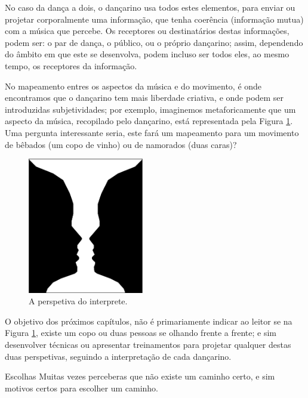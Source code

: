 No caso da dança a dois, o dançarino usa todos estes elementos, 
para enviar ou projetar corporalmente uma informação, que tenha coerência (informação mutua) com a música que percebe.
Os receptores ou destinatários destas informações, podem ser: o par de dança,
o público, ou o próprio dançarino; 
assim, dependendo do âmbito em que este se desenvolva,
podem incluso ser todos eles, ao mesmo tempo, os receptores da informação.

No mapeamento entres os aspectos da música e do movimento, 
é onde encontramos que o dançarino tem mais liberdade criativa, 
e onde podem ser introduzidas subjetividades; por exemplo,
imaginemos metaforicamente que um aspecto da música, recopilado pelo dançarino, 
está representada pela Figura \ref{fig:LaCopaDeRubin}.
Uma pergunta interessante seria, 
este fará um mapeamento para um  movimento de bêbados (um copo de vinho) ou de namorados (duas caras)?
\begin{figure}[!h]
  \centering
    \includegraphics[width=0.45\textwidth]{chapters/cap-musicalidade/LaCopaDeRubin.eps}
\caption{A perspetiva do interprete.}
\label{fig:LaCopaDeRubin}
\end{figure}

O objetivo dos próximos  capítulos, não é primariamente indicar ao leitor se na Figura \ref{fig:LaCopaDeRubin},
existe um copo ou duas pessoas se olhando frente a frente; e sim desenvolver técnicas ou 
apresentar treinamentos para projetar qualquer destas duas perspetivas, seguindo a interpretação de cada dançarino.

\begin{FraseFernandoPR}{Escolhas}
Muitas vezes perceberas que não existe um caminho certo, 
e sim motivos certos para escolher um caminho.%
\end{FraseFernandoPR}

